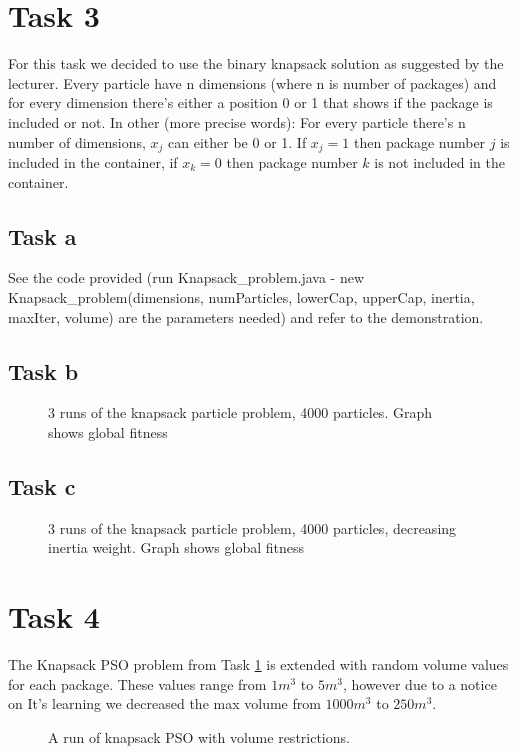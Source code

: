 \documentclass[12pt, a4paper]{article}
\begin{document}
\section{Task 3}\label{3}
For this task we decided to use the binary knapsack solution as suggested by the lecturer. Every particle have n dimensions (where n is number of packages) and for every dimension there's either a position 0 or 1 that shows if the package is included or not.
In other (more precise words):
For every particle there's n number of dimensions, $x_j$ can either be 0 or 1.
If $x_j = 1$ then package number $j$ is included in the container, if $x_k = 0$ then package number $k$ is not included in the container.

\subsection{Task a}
See the code provided (run Knapsack\_problem.java - new Knapsack\_problem(dimensions, numParticles, lowerCap, upperCap, inertia, maxIter, volume) are the parameters needed) and refer to the demonstration.

\subsection{Task b}
\begin{figure}[H]
\begin{center}
\caption{3 runs of the knapsack particle problem, 4000 particles. Graph shows global fitness}
\end{center}

\end{figure}



\subsection{Task c}
\begin{figure}[H]
\begin{center}
\caption{3 runs of the knapsack particle problem, 4000 particles, decreasing inertia weight. Graph shows global fitness}
\end{center}
\end{figure}

\section{Task 4}
The Knapsack PSO problem from Task \ref{3} is extended with random volume values for each package. These values range from $1m^3$ to $5m^3$, however due to a notice on It's learning we decreased the max volume from $1000m^3$ to $250m^3$.
\begin{figure}[H]
\begin{center}
\caption{A run of knapsack PSO with volume restrictions.}
\end{center}

\end{figure}
\end{document}
